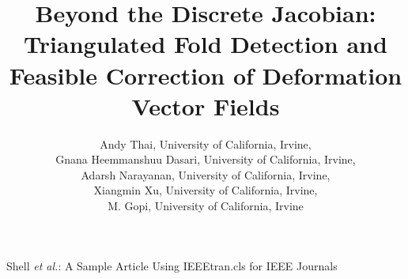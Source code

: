 \documentclass[lettersize,journal]{IEEEtran}
\begin{document}
\title{Beyond the Discrete Jacobian: Triangulated Fold Detection and Feasible Correction of Deformation Vector Fields}

\author{
        {Andy Thai, University of California, Irvine},

        {Gnana Heemmanshuu Dasari, University of California, Irvine},

        {Adarsh Narayanan, University of California, Irvine},

        {Xiangmin Xu, University of California, Irvine},
        
        {M. Gopi, University of California, Irvine}
}

%
{Shell \MakeLowercase{\textit{et al.}}: A Sample Article Using IEEEtran.cls for IEEE Journals}


\maketitle
\end{document}
